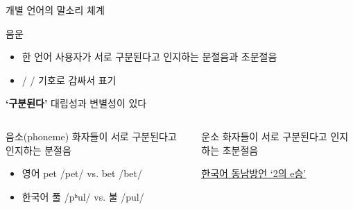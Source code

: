 \documentclass[11pt, aspectratio=169]{beamer}
\newcommand{\textds}[1]{{\ipafont #1}}
\begin{document}
\begin{frame}[t]{개별 언어의 말소리 체계}
    \begin{block}{음운}
        \begin{itemize}
            \item 한 언어 사용자가 서로 구분된다고 인지하는 분절음과 초분절음
            \item / / 기호로 감싸서 표기
        \end{itemize}
    \end{block}
    \textbf{‘구분된다’} \rightarrow 대립성과 변별성이 있다
    \begin{columns}
        \begin{column}[T]{0.46\textwidth}
            \begin{block}{음소(phoneme)}
                화자들이 서로 구분된다고 인지하는 분절음
            \end{block}            
            \begin{itemize}
                \item 영어 pet \textds{/pet/} vs. bet \textds{/bet/}
                \item 한국어 풀 \textds{/pʰul/} vs. 불 \textds{/pul/} 
            \end{itemize}            
        \end{column}
        \begin{column}[T]{0.47\textwidth}
            \begin{block}{운소}
                화자들이 서로 구분된다고 인지하는 초분절음
            \end{block}            
             \href{https://youtube.com/watch?v=GwGDfwgiOn4}{\underline{한국어 동남방언 ‘2의 e승’}}
        \end{column}
    \end{columns}
\end{frame}
\end{document}
